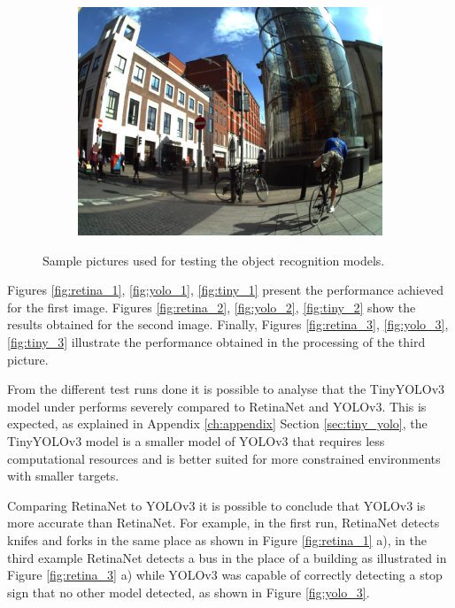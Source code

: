 \begin{figure}[H]
\begin{subfigure}{0.3\textwidth}
  \includegraphics[width=\textwidth]{Sections/4InitialWork/4_images_obj_run4/photo.jpg}
  \end{subfigure}
  
  \caption[Sample pictures used for testing]{Sample pictures used for testing the object recognition models.}
  \label{fig:picsss}
  \end{figure}


  Figures  \ref{fig:retina_1}, \ref{fig:yolo_1}, \ref{fig:tiny_1} present the performance achieved for the first image. Figures  \ref{fig:retina_2}, \ref{fig:yolo_2}, \ref{fig:tiny_2} show the results obtained for the second image. Finally, Figures \ref{fig:retina_3}, \ref{fig:yolo_3}, \ref{fig:tiny_3} illustrate the performance obtained in the processing of the third picture.


  From the different test runs done it is possible to analyse that the TinyYOLOv3 model under performs severely compared to RetinaNet and YOLOv3. This is expected, as explained in Appendix \ref{ch:appendix} Section \ref{sec:tiny_yolo}, the TinyYOLOv3 model is a smaller model of YOLOv3 that requires less computational resources and is better suited for more constrained environments with smaller targets.

  Comparing RetinaNet to YOLOv3 it is possible to conclude that YOLOv3 is more accurate than RetinaNet. For example, in the first run, RetinaNet detects knifes and forks in the same place as shown in Figure \ref{fig:retina_1} a), in the third example RetinaNet detects a bus in the place of a building as illustrated in Figure \ref{fig:retina_3} a) while YOLOv3 was capable of correctly detecting a stop sign that no other model detected, as shown in Figure \ref{fig:yolo_3}.

